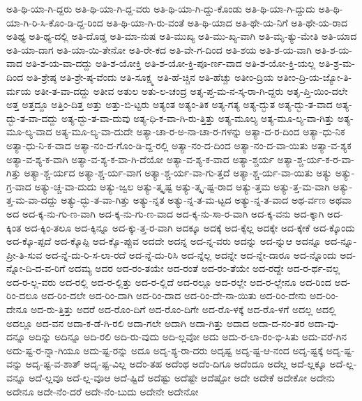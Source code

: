 {ಅತಿ-ಥಿ-ಯಾ-ಗಿ-ದ್ದರು
ಅತಿ-ಥಿ-ಯಾ-ಗಿ-ದ್ದ-ವರು
ಅತಿ-ಥಿ-ಯಾ-ಗಿ-ದ್ದು-ಕೊಂಡು
ಅತಿ-ಥಿ-ಯಾ-ಗಿ-ದ್ದುದು
ಅತಿ-ಥಿ-ಯಾ-ಗಿ-ರಿ-ಸಿ-ಕೊಂ-ಡಿ-ದ್ದ-ರಿಂದ
ಅತಿ-ಥಿ-ಯಾ-ಗಿ-ರು-ವಂತೆ
ಅತಿ-ಥಿ-ಯಾದ
ಅತಿ-ಥೇ-ಯ-ನಿಗೆ
ಅತಿ-ಥೇ-ಯ-ರಾದ
ಅತಿಥ್ಯ
ಅತಿ-ಥ್ಯ-ದಲ್ಲಿ
ಅತಿ-ದೊಡ್ಡ
ಅತಿ-ಮಾ-ನುಷ
ಅತಿ-ಮುಖ್ಯ
ಅತಿ-ಮು-ಖ್ಯ-ವಾಗಿ
ಅತಿ-ಮೃ-ತ್ಯು-ಮೇತಿ
ಅತಿ-ಯಾದ
ಅತಿ-ಯಾ-ದಾಗ
ಅತಿ-ಯಾ-ಯಿ-ತೇನೋ
ಅತಿ-ರೇ-ಕದ
ಅತಿ-ವೇ-ಗ-ದಿಂದ
ಅತಿ-ಶಯ
ಅತಿ-ಶ-ಯ-ವಾಗಿ
ಅತಿ-ಶ-ಯ-ವಾದ
ಅತಿ-ಶ-ಯ-ವಾ-ದದ್ದು
ಅತಿ-ಶ-ಯೋಕ್ತಿ
ಅತಿ-ಶ-ಯೋ-ಕ್ತಿ-ಪೂ-ರ್ಣ-ವಾದ
ಅತಿ-ಶ-ಯೋ-ಕ್ತಿ-ಯಲ್ಲ
ಅತಿ-ಶ್ರ-ಮ-ದಿಂದ
ಅತಿ-ಶ್ರೇಷ್ಠ
ಅತಿ-ಶ್ರೇ-ಷ್ಠ-ವೆಂದು
ಅತಿ-ಸೂಕ್ಷ್ಮ
ಅತಿ-ಹೆ-ಚ್ಚಿನ
ಅತಿ-ಹೆಚ್ಚು
ಅತೀಂ-ದ್ರಿಯ
ಅತೀಂ-ದ್ರಿ-ಯ-ಜ್ಯೋ-ತಿ-ರ್ಮಯ
ಅತೀ-ತ-ವಾ-ದದ್ದು
ಅತೀವ
ಅತುಲ
ಅತು-ಲ-ಚಂದ್ರ
ಅತೃ-ಪ್ತ-ಮ-ನ-ಸ್ಕ-ರಾ-ಗಿ-ದ್ದರು
ಅತೃ-ಪ್ತಿ-ಯಿಂ-ದಲೇ
ಅತ್ತ
ಅತ್ತದ್ದೂ
ಅತ್ತಿಂ-ದಿತ್ತ
ಅತ್ತು
ಅತ್ತು-ಬಿ-ಟ್ಟರು
ಅತ್ಯಂತ
ಅತ್ಯಂ-ತಿಕ
ಅತ್ಯ-ಗತ್ಯ
ಅತ್ಯ-ದ್ಭುತ
ಅತ್ಯ-ದ್ಭು-ತ-ವಾದ
ಅತ್ಯ-ದ್ಭು-ತ-ವಾ-ದದ್ದು
ಅತ್ಯ-ದ್ಭು-ತ-ವಾ-ದುವು
ಅತ್ಯ-ಧಿ-ಕ-ವಾ-ಗಿ-ರು-ತ್ತಿತ್ತು
ಅತ್ಯ-ಮೂಲ್ಯ
ಅತ್ಯ-ಮೂ-ಲ್ಯ-ವಾ-ಗಿತ್ತು
ಅತ್ಯ-ಮೂ-ಲ್ಯ-ವಾದ
ಅತ್ಯ-ಮೂ-ಲ್ಯ-ವಾ-ದುದೇ
ಅತ್ಯಾ-ಚಾ-ರ-ಅ-ನಾ-ಚಾ-ರ-ಗಳನ್ನು
ಅತ್ಯಾ-ದ-ರ-ದಿಂದ
ಅತ್ಯಾ-ಧು-ನಿಕ
ಅತ್ಯಾ-ಧು-ನಿ-ಕ-ವಾದ
ಅತ್ಯಾ-ನಂ-ದ-ಗೊಂ-ಡಿ-ದ್ದ-ರಲ್ಲಿ
ಅತ್ಯಾ-ನಂ-ದ-ದಿಂದ
ಅತ್ಯಾ-ನಂ-ದ-ವಾ-ಯಿತು
ಅತ್ಯಾ-ವ-ಶ್ಯಕ
ಅತ್ಯಾ-ವ-ಶ್ಯ-ಕ-ವಾಗಿ
ಅತ್ಯಾ-ವ-ಶ್ಯ-ಕ-ವಾ-ಗಿ-ದೆಯೋ
ಅತ್ಯಾ-ವ-ಶ್ಯ-ಕ-ವಾದ
ಅತ್ಯಾ-ಶ್ಚರ್ಯ
ಅತ್ಯಾ-ಶ್ಚ-ರ್ಯ-ಕ-ರ-ವಾ-ಗಿತ್ತು
ಅತ್ಯಾ-ಶ್ಚ-ರ್ಯದ
ಅತ್ಯಾ-ಶ್ಚ-ರ್ಯ-ವಾಗ
ಅತ್ಯಾ-ಶ್ಚ-ರ್ಯ-ವಾ-ಗು-ತ್ತದೆ
ಅತ್ಯಾ-ಶ್ಚ-ರ್ಯ-ವಾ-ಯಿತು
ಅತ್ಯು
ಅತ್ಯು-ಗ್ರ-ವಾದ
ಅತ್ಯು-ಚ್ಚ-ವಾ-ದುದು
ಅತ್ಯು-ಜ್ವಲ
ಅತ್ಯು-ತ್ಕೃಷ್ಟ
ಅತ್ಯು-ತ್ಕೃ-ಷ್ಟ-ರಾದ
ಅತ್ಯು-ತ್ತಮ
ಅತ್ಯು-ತ್ತ-ಮ-ವಾಗಿ
ಅತ್ಯು-ತ್ತ-ಮ-ವಾ-ದದ್ದು
ಅತ್ಯು-ದ್ಭು-ತ-ವಾ-ಗಿತ್ತು
ಅತ್ಯು-ನ್ನತ
ಅತ್ಯು-ನ್ನ-ತ-ಮ-ಟ್ಟದ
ಅತ್ಯು-ನ್ನ-ತ-ವಾದ
ಅಥ-ರ್ವಣ
ಅಥವಾ
ಅದ
ಅದ-ಕ್ಕ-ನು-ಗು-ಣ-ವಾಗಿ
ಅದ-ಕ್ಕ-ನು-ಗು-ಣ-ವಾದ
ಅದ-ಕ್ಕ-ನು-ಸಾ-ರ-ವಾಗಿ
ಅದ-ಕ್ಕ-ವನು
ಅದ-ಕ್ಕಾಗಿ
ಅದ-ಕ್ಕಿಂತ
ಅದ-ಕ್ಕಿಂ-ತಲೂ
ಅದ-ಕ್ಕಿನ್ನೂ
ಅದ-ಕ್ಕು-ತ್ತ-ರ-ವಾಗಿ
ಅದಕ್ಕೂ
ಅದಕ್ಕೆ
ಅದ-ಕ್ಕೆಲ್ಲ
ಅದಕ್ಕೇ
ಅದ-ಕ್ಕೇಕೆ
ಅದ-ಕ್ಕೊಂದು
ಅದ-ಕ್ಕೊ-ಪ್ಪದೆ
ಅದ-ಕ್ಕೊಪ್ಪಿ
ಅದ-ಕ್ಕೊ-ಪ್ಪುವ
ಅದದೇ
ಅದನ್ನ
ಅದ-ನ್ನ-ವರು
ಅದನ್ನು
ಅದ-ನ್ನುಆ
ಅದನ್ನೂ
ಅದ-ನ್ನೂ-ಪ್ರೀ-ತಿ-ಸುವ
ಅದ-ನ್ನೆ-ದು-ರಿ-ಸ-ಲಾ-ರದೆ
ಅದ-ನ್ನೆ-ದು-ರಿಸಿ
ಅದ-ನ್ನೆಲ್ಲ
ಅದನ್ನೇ
ಅದ-ನ್ನೇ-ದಾರೂ
ಅದ-ನ್ನೊಂದು
ಅದ-ನ್ನೋ-ದಿ-ದ-ವ-ರಿಗೆ
ಅದಮ್ಯ
ಅದರ
ಅದ-ರಂ-ತಯೇ
ಅದ-ರಂತೆ
ಅದ-ರಂ-ತೆಯೇ
ಅದ-ರದ್ದೇ
ಅದ-ರ-ರ್ಥ-ವಲ್ಲ
ಅದ-ರ-ಲ್ಲ-ವರು
ಅದ-ರಲ್ಲಿ
ಅದ-ರ-ಲ್ಲಿತ್ತು
ಅದ-ರ-ಲ್ಲಿದೆ
ಅದ-ರಲ್ಲೂ
ಅದ-ರಲ್ಲೇ
ಅದ-ರ-ಲ್ಲೇನೂ
ಅದ-ರಿಂದ
ಅದ-ರಿಂ-ದಲೂ
ಅದ-ರಿಂ-ದಲೇ
ಅದ-ರಿಂ-ದಾಗಿ
ಅದ-ರಿಂ-ದಾದ
ಅದ-ರಿಂ-ದೇ-ನಾ-ಯಿತು
ಅದ-ರಿಂ-ದೇನು
ಅದ-ರಿಂ-ದೇನೂ
ಅದ-ರು-ತ್ತಿತ್ತು
ಅದರೆ
ಅದ-ರೊಂ-ದಿಗೆ
ಅದ-ರೊಂ-ದಿಗೇ
ಅದ-ರೊ-ಳಕ್ಕೆ
ಅದ-ರೊ-ಳಗೆ
ಅದಲ್ಲ
ಅದಲ್ಲಿ
ಅದಲ್ಲೂ
ಅದ-ವನ
ಅದಾ-ಕ-ಡೆ-ಗಿ-ರಲಿ
ಅದಾ-ಗಲೇ
ಅದಾಗಿ
ಅದಾ-ಗಿತ್ತು
ಅದಾದ
ಅದಾ-ದ-ನಂ-ತರ
ಅದಾ-ವು-ದನ್ನೂ
ಅದಿನ್ನು
ಅದಿನ್ನೂ
ಅದಿ-ರಲಿ
ಅದಿ-ರು-ವುದು
ಅದಿ-ಲ್ಲವೋ
ಅದು
ಅದು-ರ-ಲಾ-ರಂ-ಭಿ-ಸಿತು
ಅದು-ವರೆ-ಗಿನ
ಅದು-ಷ್ಟ-ರ-ನ್ನಾ-ಗಿಯೂ
ಅದು-ಷ್ಟ-ರನ್ನು
ಅದೂ
ಅದೃ-ಶ್ಯ-ರಾ-ದರು
ಅದೃಷ್ಟ
ಅದೃ-ಷ್ಟ-ಆ-ನಂದ
ಅದೃ-ಷ್ಟಕ್ಕೆ
ಅದೃ-ಷ್ಟ-ವನ್ನು
ಅದೃ-ಷ್ಟ-ವ-ಶಾತ್
ಅದೃ-ಷ್ಟ-ವಿಲ್ಲ
ಅದೆಂ-ತಹ
ಅದೆಂಥ
ಅದೆಂ-ದಿಗೂ
ಅದೆಂದೂ
ಅದೆಲ್ಲ
ಅದೆ-ಲ್ಲಕ್ಕೂ
ಅದೆ-ಲ್ಲ-ವನ್ನೂ
ಅದೆ-ಲ್ಲವೂ
ಅದೆ-ಲ್ಲ-ವೂಆ
ಅದೆ-ಷ್ಟಿದೆ
ಅದೆಷ್ಟು
ಅದೆಷ್ಟೇ
ಅದೆಷ್ಟೋ
ಅದೇ
ಅದೇಕೆ
ಅದೇಕೋ
ಅದೇನು
ಅದೇನೂ
ಅದೇ-ನೆಂ-ದರೆ
ಅದೇ-ನೆಂ-ಬುದು
ಅದೇನೇ
ಅದೇನೋ
}
